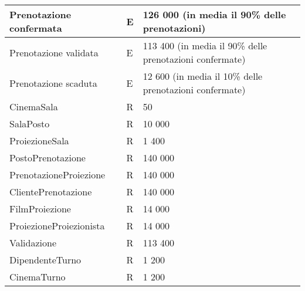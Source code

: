 \begin{tabularx}{\linewidth}{|X|l|X|}
    Prenotazione confermata
     & E
     & 126 000 (in media il 90\% delle prenotazioni)
    \\ \hline
    Prenotazione validata
     & E
     & 113 400 (in media il 90\% delle prenotazioni confermate)
    \\ \hline
    Prenotazione scaduta
     & E
     & 12 600 (in media il 10\% delle prenotazioni confermate)
    \\ \hline
    CinemaSala
     & R
     & 50
    \\ \hline
    SalaPosto
     & R
     & 10 000
    \\ \hline
    ProiezioneSala
     & R
     & 1 400
    \\ \hline
    PostoPrenotazione
     & R
     & 140 000
    \\ \hline
    PrenotazioneProiezione
     & R
     & 140 000
    \\ \hline
    ClientePrenotazione
     & R
     & 140 000
    \\ \hline
    FilmProiezione
     & R
     & 14 000
    \\ \hline
    ProiezioneProiezionista
     & R
     & 14 000
    \\ \hline
    Validazione
     & R
     & 113 400
    \\ \hline
    DipendenteTurno
     & R
     & 1 200
    \\ \hline
    CinemaTurno
     & R
     & 1 200
    \\ \hline
\end{tabularx}

